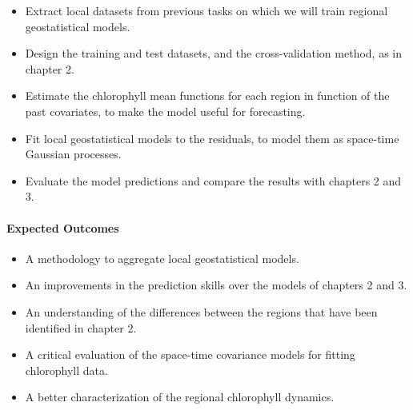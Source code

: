 \begin{itemize}

\item Extract local datasets from previous tasks on which we will train
regional geostatistical models.

\item Design the training and test datasets, and the cross-validation method,
as in chapter 2.

\item Estimate the chlorophyll mean functions for each region in function of
the past covariates, to make the model useful for forecasting.

\item Fit local geostatistical models to the residuals, to model them as
space-time Gaussian processes.

\item Evaluate the model predictions and compare the results with chapters 2
and 3.

\end{itemize}

\paragraph{Expected Outcomes}

\begin{itemize}

\item A methodology to aggregate local geostatistical models.

\item An improvements in the prediction skills over the models of chapters 2
and 3.

\item An understanding of the differences between the regions that have been
identified in chapter 2.

\item A critical evaluation of the space-time covariance models for fitting
chlorophyll data.

\item A better characterization of the regional chlorophyll dynamics.

\end{itemize}
